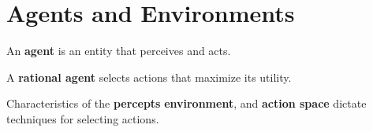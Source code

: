 
\section{Agents and Environments}

\begin{definition}
	An \textbf{agent} is an entity that perceives and acts.
\end{definition}

\begin{definition}
	A \textbf{rational agent} selects actions that maximize its utility.
\end{definition}

\begin{definition}
	Characteristics of the \textbf{percepts} \textbf{environment}, and \textbf{action space} dictate techniques for selecting actions.
\end{definition}
